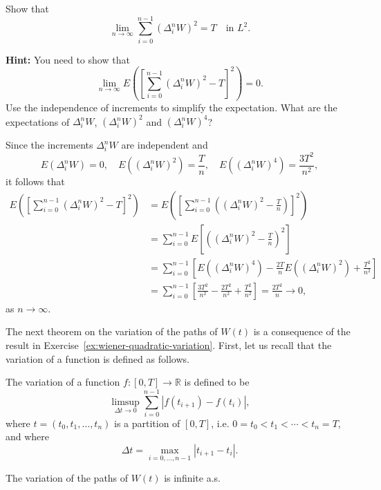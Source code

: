 \begin{Exercise}
\label{ex:wiener-quadratic-variation}
Show that
\[
\lim_{n \to \infty} \sum_{i=0}^{n-1} (\Delta_i^n W)^2 = T \quad \text{in } L^2.
\]

\noindent\textbf{Hint:} You need to show that
\[
\lim_{n \to \infty} E\left(\left[\sum_{i=0}^{n-1} (\Delta_i^n W)^2 - T\right]^2\right) = 0.
\]
Use the independence of increments to simplify the expectation. What are the expectations of $\Delta_i^n W$, $(\Delta_i^n W)^2$ and $(\Delta_i^n W)^4$?
\end{Exercise}

\begin{Solution}
Since the increments $\Delta_i^n W$ are independent and
\[
E(\Delta_i^n W) = 0, \quad E\left((\Delta_i^n W)^2\right) = \frac{T}{n}, \quad E\left((\Delta_i^n W)^4\right) = \frac{3T^2}{n^2},
\]
it follows that
\begin{equation}
\begin{aligned}
E\left(\left[\sum_{i=0}^{n-1} (\Delta_i^n W)^2 - T\right]^2\right) &= E\left(\left[\sum_{i=0}^{n-1} \left((\Delta_i^n W)^2 - \frac{T}{n}\right)\right]^2\right) \\
&= \sum_{i=0}^{n-1} E\left[\left((\Delta_i^n W)^2 - \frac{T}{n}\right)^2\right] \\
&= \sum_{i=0}^{n-1} \left[E\left((\Delta_i^n W)^4\right) - \frac{2T}{n}E\left((\Delta_i^n W)^2\right) + \frac{T^2}{n^2}\right] \\
&= \sum_{i=0}^{n-1} \left[\frac{3T^2}{n^2} - \frac{2T^2}{n^2} + \frac{T^2}{n^2}\right] = \frac{2T^2}{n} \to 0,
\end{aligned}
\end{equation}
as $n \to \infty$.
\end{Solution}

The next theorem on the variation of the paths of $W(t)$ is a consequence of the result in Exercise~\ref{ex:wiener-quadratic-variation}. First, let us recall that the variation of a function is defined as follows.

\begin{Definition}[Variation]
\label{def:variation}
The variation of a function $f: [0,T] \to \mathbb{R}$ is defined to be
\[
\limsup_{\Delta t \to 0} \sum_{i=0}^{n-1} |f(t_{i+1}) - f(t_i)|,
\]
where $t = (t_0, t_1, \ldots, t_n)$ is a partition of $[0, T]$, i.e. $0 = t_0 < t_1 < \cdots < t_n = T$, and where
\[
\Delta t = \max_{i=0, \ldots, n-1} |t_{i+1} - t_i|.
\]
\end{Definition}

\begin{Theorem}
\label{thm:wiener-infinite-variation}
The variation of the paths of $W(t)$ is infinite a.s.
\end{Theorem}

